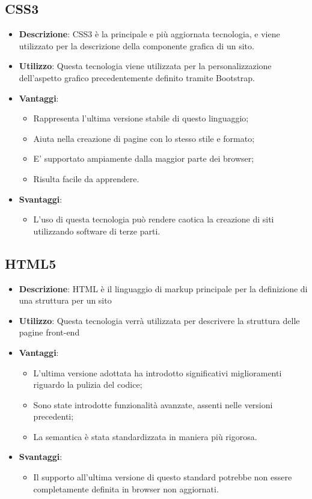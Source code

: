\subsection{CSS3}
\begin{itemize}
	\item \textbf{Descrizione}: CSS3 è la principale e più aggiornata tecnologia, e viene utilizzato per la descrizione della componente grafica di un sito.
	\item \textbf{Utilizzo}: Questa tecnologia viene utilizzata per la personalizzazione dell'aspetto grafico precedentemente definito tramite Bootstrap.
	\item \textbf{Vantaggi}:
	\begin{itemize}
		\item Rappresenta l'ultima versione stabile di questo linguaggio;
		\item Aiuta nella creazione di pagine con lo stesso stile e formato;
		\item E' supportato ampiamente dalla maggior parte dei browser;
		\item Risulta facile da apprendere.
	\end{itemize}
	\item \textbf{Svantaggi}:
	\begin{itemize}
		\item L'uso di questa tecnologia può rendere caotica la creazione di siti utilizzando software di terze parti.
	\end{itemize}
\end{itemize}

\subsection{HTML5}
\begin{itemize}
	\item \textbf{Descrizione}: HTML è il linguaggio di markup principale per la definizione di una struttura per un sito
	\item \textbf{Utilizzo}: Questa tecnologia verrà utilizzata per descrivere la struttura delle pagine front-end
	\item \textbf{Vantaggi}:
	\begin{itemize}
		\item L'ultima versione adottata ha introdotto significativi miglioramenti riguardo la pulizia del codice;
		\item Sono state introdotte funzionalità avanzate, assenti nelle versioni precedenti;
		\item La semantica è stata standardizzata in maniera più rigorosa.
	\end{itemize}
	\item \textbf{Svantaggi}:
	\begin{itemize}
		\item Il supporto all'ultima versione di questo standard potrebbe non essere completamente definita in browser non aggiornati.
	\end{itemize}
\end{itemize}

